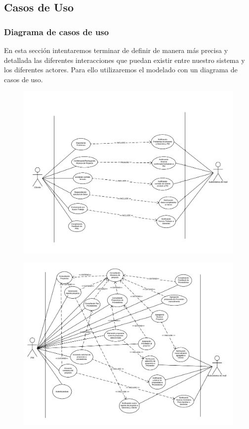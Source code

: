 \subsection{Casos de Uso}
    \subsubsection{Diagrama de casos de uso}
En esta sección intentaremos terminar de definir de manera más precisa y detallada las diferentes interacciones que puedan existir entre nuestro sistema y los diferentes actores. Para ello utilizaremos el modelado con un diagrama de casos de uso.

\begin{figure}[H]
\centering
\includegraphics[width=\linewidth]{diag/viejos/cu1.pdf}
\end{figure}

\begin{figure}[H]
\centering
\includegraphics[width=\linewidth]{diag/viejos/cu2.pdf}
\end{figure}

